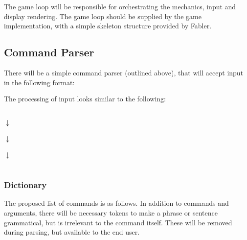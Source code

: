 \documentclass[letterpaper, twoside, 12pt]{memoir}
\begin{document}
The game loop will be responsible for orchestrating the mechanics, input and display rendering. The game loop should be supplied by the game implementation, with a simple skeleton structure provided by Fabler.

\subsection{Command Parser}

There will be a simple command parser (outlined above), that will accept input in the following format:

\begin{center}
\end{center}

The processing of input looks similar to the following:

\begin{center}
   \\
  \vspace{\fill}
  {\large $\downarrow$} \\
  \vspace{\fill}
   \\
  \vspace{\fill}
  {\large $\downarrow$} \\
  \vspace{\fill}
   \\
  \vspace{\fill}
  {\large $\downarrow$} \\
  \vspace{\fill}
   \\
\end{center}

\subsubsection{Dictionary}
The proposed list of commands is as follows. In addition to commands and arguments, there will be necessary tokens to make a phrase or sentence grammatical, but is irrelevant to the command itself. These will be removed during parsing, but available to the end user.
\end{document}
